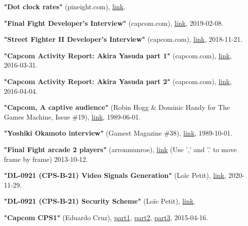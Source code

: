 \begin{thebibliography}{999}
  \textbf{"Dot clock rates"} (pineight.com),
  \href{https://pineight.com/mw/page/Dot_clock_rates.xhtml}{link}.

  \textbf{"Final Fight Developer's Interview"} (capcom.com),
  \href{https://game.capcom.com/cfn/sfv/column/132673?lang=en}{link},
  2019-02-08.

  \textbf{"Street Fighter II Developer's Interview"} (capcom.com),
  \href{https://game.capcom.com/cfn/sfv/column/132595?lang=en}{link},
  2018-11-21.

  \textbf{"Capcom Activity Report: Akira Yasuda part 1"} (capcom.com),
  \href{https://game.capcom.com/cfn/sfv/column/112429}{link},
  2016-03-31.

  \textbf{"Capcom Activity Report: Akira Yasuda part 2"} (capcom.com),
  \href{https://game.capcom.com/cfn/sfv/column/112432}{link},
  2016-04-04.

  \textbf{"Capcom, A captive audience"} (Robin Hogg \& Dominic Handy for The Games Machine, Issue \#19),
  \href{https://archive.org/details/the-games-machine-19/page/n23/mode/2up}{link},
  1989-06-01.

  \textbf{"Yoshiki Okamoto interview"} (Gamest Magazine \#38),
  \href{https://retrocdn.net/images/9/91/Gamest_JP_038.pdf}{link},
  1989-10-01.

  \textbf{"Final Fight arcade 2 players"} (arronmunroe),
  \href{https://youtu.be/HyAHGHo22Og?t=1707}{link} (Use ',' and '.' to move frame by frame)
  2013-10-12.

  \textbf{"DL-0921 (CPS-B-21) Video Signals Generation"} (Lo\"{i}c Petit),
  \href{https://gitlab.com/loic.petit/cps2-reverse/-/blob/master/DLs/DL-0921/doc/video-signals.md}{link},
  2020-11-29.

  \textbf{"DL-0921 (CPS-B-21) Security Scheme"} (Lo\"{i}c Petit),
  \href{https://gitlab.com/loic.petit/cps2-reverse/-/blob/master/DLs/DL-0921/doc/security-scheme.md}{link}.

  \textbf{"Capcom CPS1"} (Eduardo Cruz),
  \href{http://arcadehacker.blogspot.com/2015/04/capcom-cps1-part-1.html}{part1},
  \href{http://arcadehacker.blogspot.com/2015/05/capcom-cps1-part-2.html}{part2},
  \href{http://arcadehacker.blogspot.com/2015/06/capcom-cps1-part-3.html}{part3},
  2015-04-16.
  

\end{thebibliography}
